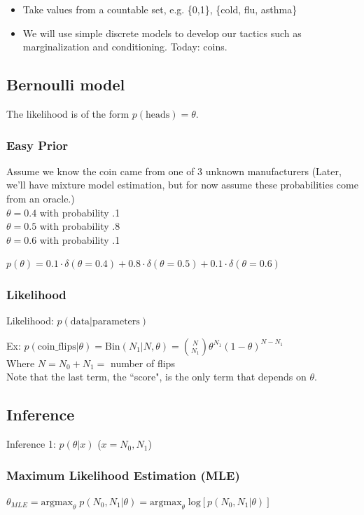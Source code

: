 \documentclass{article}
\begin{document}

\begin{itemize}
\item Take values from a countable set, e.g. \{0,1\}, \{cold, flu, asthma\}
\item We will use simple discrete models to develop our tactics such as marginalization and conditioning. Today: coins.
\end{itemize}

\subsection{Bernoulli model}
The likelihood is of the form $p(\text{heads}) = \theta$.

\subsubsection*{Easy Prior}
Assume we know the coin came from one of 3 unknown manufacturers (Later, we'll have mixture model estimation, but for now assume these probabilities come from an oracle.)\\
$\theta = 0.4$ with probability .1\\
$\theta = 0.5$ with probability .8\\
$\theta = 0.6$ with probability .1

$p(\theta) = 0.1 \cdot \delta(\theta = 0.4)  + 0.8 \cdot \delta(\theta = 0.5) + 0.1 \cdot \delta(\theta = 0.6)$


\subsubsection*{Likelihood}
Likelihood: $p(\text{data}|\text{parameters})$

Ex: $p(\text{coin\_flips}|\theta) = \textrm{Bin}(N_1 | N, \theta) = {N \choose N_1} \theta^{N_1} (1-\theta)^{N-N_1}$\\
Where $N = N_0 + N_1 =$ number of flips\\
Note that the last term, the ``score", is the only term that depends on $\theta$.

\subsection{Inference}
Inference 1: $p(\theta|x)$ ($x = N_0, N_1$)

\subsubsection*{Maximum Likelihood Estimation (MLE)}
$\theta_{MLE} = \textrm{argmax}_{\theta} \; p(N_0,N_1 | \theta) = \textrm{argmax}_{\theta}  \;\textrm{log}\left[p(N_0,N_1 | \theta)\right]$
\end{document}
